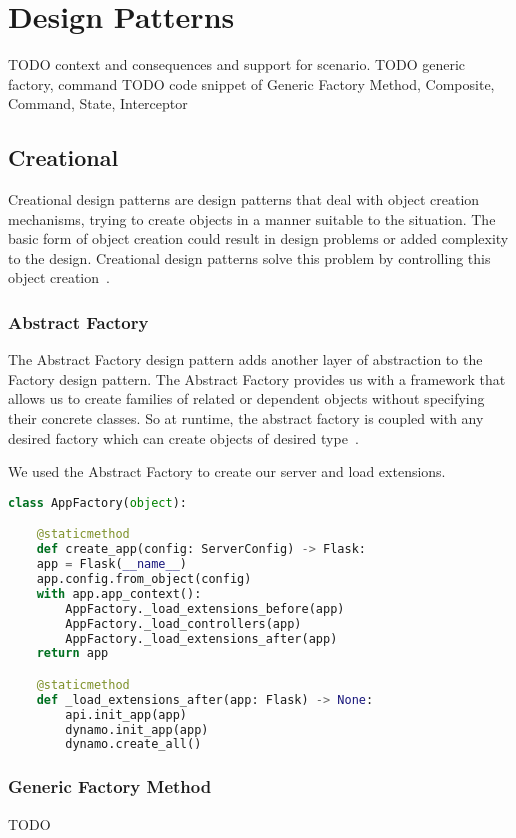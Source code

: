 \chapter{Design Patterns}
TODO context and consequences and support for scenario.
TODO generic factory, command
TODO code snippet of Generic Factory Method, Composite, Command, State, Interceptor

\section{Creational}
Creational design patterns are design patterns that deal with object creation
mechanisms, trying to create objects in a manner suitable to the situation. The basic form of object
creation could result in design problems or added complexity to the design. Creational design patterns
solve this problem by controlling this object creation~\citep{OODesign}.

\subsection{Abstract Factory}
The Abstract Factory design pattern adds another layer of abstraction to the Factory design pattern.
The Abstract Factory provides us with a framework that allows us to create families of related or
dependent objects without specifying their concrete classes. So at runtime, the abstract factory is
coupled with any desired factory which can create objects of desired type~\citep{OODesign}.

We used the Abstract Factory to create our server and load extensions.


\begin{lstlisting}[language=Python]
class AppFactory(object):

	@staticmethod
	def create_app(config: ServerConfig) -> Flask:
	app = Flask(__name__)
	app.config.from_object(config)
	with app.app_context():
		AppFactory._load_extensions_before(app)
		AppFactory._load_controllers(app)
		AppFactory._load_extensions_after(app)
	return app

	@staticmethod
	def _load_extensions_after(app: Flask) -> None:
		api.init_app(app)
		dynamo.init_app(app)
		dynamo.create_all()
\end{lstlisting}


\subsection{Generic Factory Method}
TODO

